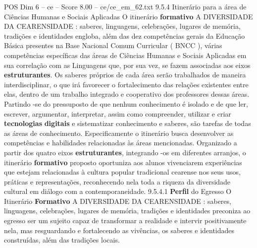 \begin{textsample}{POS Dim 6 – ce – Score 8.00 – ce/ce\_em\_62.txt}  \label{ex:f6_pos_040}
9.5.4 Itinerário para a área de Ciências Humanas e Sociais Aplicadas O itinerário \textbf{formativo} A DIVERSIDADE DA CEARENSIDADE : saberes, linguagens, celebrações, lugares de memória, tradições e identidades engloba, além das dez competências gerais da Educação Básica presentes na Base Nacional Comum Curricular ( BNCC ), várias competências específicas das áreas de Ciências Humanas e Sociais Aplicadas em sua correlação com as Linguagens que, por sua vez, se fazem associadas aos eixos \textbf{estruturantes}.
Os saberes próprios de cada área serão trabalhados de maneira interdisciplinar, o que irá favorecer o fortalecimento das relações existentes entre elas, dentro de um trabalho integrado e cooperativo dos professores dessas áreas.
Partindo -se do pressuposto de que nenhum conhecimento é isolado e de que ler, escrever, argumentar, interpretar, assim como compreender, utilizar e criar \textbf{tecnologias} \textbf{digitais} e sistematizar conhecimento e saberes, são tarefas de todas as áreas de conhecimento.
Especificamente o itinerário busca desenvolver as competências e habilidades relacionadas às áreas mencionadas.
Organizado a partir dos quatro eixos \textbf{estruturantes}, integrando -os em diferentes arranjos, o itinerário \textbf{formativo} proposto oportuniza aos alunos vivenciarem experiências que estejam relacionadas à cultura popular tradicional cearense nos seus usos, práticas e representações, reconhecendo nela toda a riqueza da diversidade cultural em diálogo com a contemporaneidade. 9.5.4.1 \textbf{Perfil} do Egresso O Itinerário \textbf{Formativo} A DIVERSIDADE DA CEARENSIDADE : saberes, linguagens, celebrações, lugares de memória, tradições e identidades preconiza ao egresso ser um sujeito capaz de transformar a realidade e intervir positivamente nela, mas resguardando e fortalecendo as vivências, os saberes e identidades construídas, além das tradições locais.

\end{textsample}
